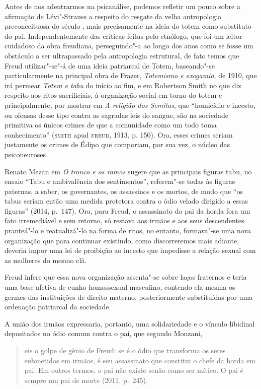 Antes de nos adentrarmos na psicanálise, podemos refletir um pouco sobre
a afirmação de Lévi"-Strauss a respeito do resgate da velha antropologia
preconceituosa do século , mais precisamente na ideia do totem como
substituto do pai. Independentemente das críticas feitas pelo etnólogo,
que foi um leitor cuidadoso da obra freudiana, perseguindo"-a ao longo
dos anos como se fosse um obstáculo a ser ultrapassado pela antropologia
estrutural, de fato temos que Freud utilizar"-se"-á de uma ideia
patriarcal de Totem, baseando"-se particularmente na principal obra de
Frazer, \emph{Totemismo e exogamia}, de 1910, que irá permear \emph{Totem e
tabu} do início ao fim, e em Robertson Smith no que diz respeito aos
ritos sacrificiais, à organização social em torno do totem e
principalmente, por mostrar em \emph{A religião dos Semitas}, que
``homicídio e incesto, ou ofensas desse tipo contra as sagradas leis do
sangue, são na sociedade primitiva os únicos crimes de que a comunidade
como um todo toma conhecimento'' (\textsc{smith} apud \textsc{freud}, 1913, p. 150). Ora,
esses crimes seriam justamente os crimes de Édipo que comporiam, por sua
vez, o núcleo das psiconeuroses.

Renato Mezan em \emph{O tronco e os ramos} sugere que as
principais figuras tabu, no ensaio ``Tabu e ambivalência dos
sentimentos'', referem"-se todas às figuras paternas, a saber, os
governantes, os assassinos e os mortos, de modo que ``os tabus seriam
então uma medida protetora contra o ódio velado dirigido a essas
figuras'' (2014, p.~147). Ora, para Freud, o assassinato do pai
da horda fora um fato irremediável e sem retorno, só restava aos irmãos
e aos seus descendentes pranteá"-lo e reatualizá"-lo na forma de ritos, no
entanto, formava"-se uma nova organização que para continuar existindo,
como discorreremos mais adiante, deveria impor uma lei de proibição ao
incesto que impedisse a relação sexual com as mulheres do mesmo clã.

Freud infere que essa nova organização assenta"-se sobre laços fraternos
e teria uma base afetiva de cunho homossexual masculino, contendo ela
mesma os germes das instituições de direito materno, posteriormente
substituídas por uma ordenação patriarcal da sociedade.

A união dos irmãos expressaria, portanto, uma solidariedade e o vínculo
libidinal depositados no ódio comum contra o pai, que segundo Monzani,

\begin{quote}
eis o golpe de gênio de Freud: se é o ódio que transforma os seres
submetidos em irmãos, é seu assassinato que constitui o chefe da horda
em pai. Em outros termos, o pai não existe senão como ser mítico. O pai
é sempre um pai de morte (2011, p.~245).
\end{quote}

